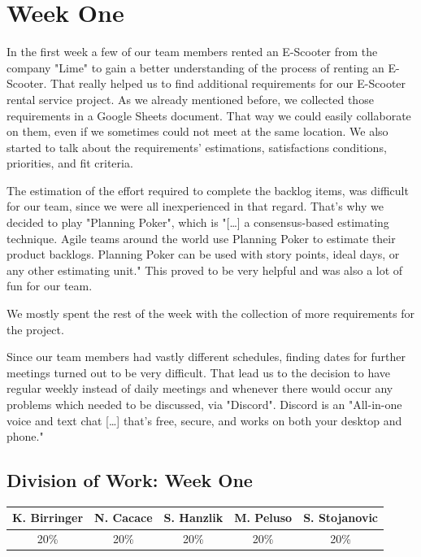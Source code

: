 \documentclass[a4paper, 12pt]{article}
\begin{document}
\section{Week One}
In the first week a few of our team members rented an E-Scooter from the company "Lime" to gain a better understanding of the process of renting an E-Scooter. That really helped us to find additional requirements for our E-Scooter rental service project. As we already mentioned before, we collected those requirements in a Google Sheets document. That way we could easily collaborate on them, even if we sometimes could not meet at the same location. We also started to talk about the requirements' estimations, satisfactions conditions, priorities, and fit criteria.

The estimation of the effort required to complete the backlog items, was difficult for our team, since we were all inexperienced in that regard. That's why we decided to play "Planning Poker", which is "[\ldots] a consensus-based estimating technique. Agile teams around the world use Planning Poker to estimate their product backlogs. Planning Poker can be used with story points, ideal days, or any other estimating unit." \cite{planning-poker} This proved to be very helpful and was also a lot of fun for our team.

We mostly spent the rest of the week with the collection of more requirements for the project.

Since our team members had vastly different schedules, finding dates for further meetings turned out to be very difficult. That lead us to the decision to have regular weekly instead of daily meetings and whenever there would occur any problems which needed to be discussed, via "Discord". Discord is an "All-in-one voice and text chat [\ldots] that's free, secure, and works on both your desktop and phone."\cite{discord}

\subsection{Division of Work: Week One}
\begin{table}[htbp]
\centering
\setlength{\tabcolsep}{10pt}
\begin{tabular}{|c|c|c|c|c|}
\hline
K. Birringer & N. Cacace & S. Hanzlik & M. Peluso & S. Stojanovic\\
\hline
20\%   &20\%  &20\%  &20\%  &20\%\\
\hline
\end{tabular}
\end{table}
\end{document}
